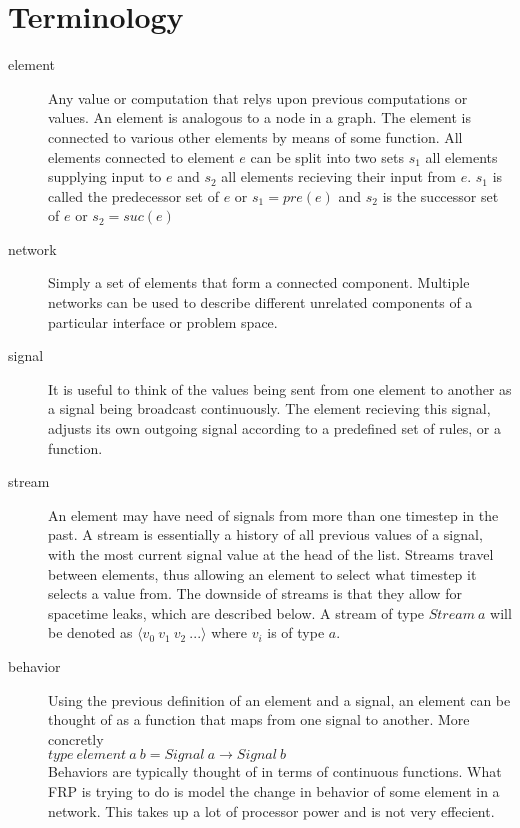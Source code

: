 \documentclass[twocolumn]{paper}
\begin{document}
\section{Terminology}
\begin{description}
\item[element] Any value or computation that relys upon previous computations or values. An element is analogous to a node in a graph. The element is connected to various other elements by means of some function. All elements connected to element $e$ can be split into two sets $s_1$ all elements supplying input to $e$ and $s_2$ all elements recieving their input from $e$. $s_1$ is called the predecessor set of $e$ or $s_1 = pre(e)$ and $s_2$ is the successor set of $e$ or $s_2 = suc(e)$

\item[network] Simply a set of elements that form a connected component. Multiple networks can be used to describe different unrelated components of a particular interface or problem space.

\item[signal] It is useful to think of the values being sent from one element to another as a signal being broadcast continuously. The element recieving this signal, adjusts its own outgoing signal according to a predefined set of rules, or a function.

\item[stream] An element may have need of signals from more than one timestep in the past. A stream is essentially a history of all previous values of a signal, with the most current signal value at the head of the list. Streams travel between elements, thus allowing an element to select what timestep it selects a value from. The downside of streams is that they allow for spacetime leaks, which are described below. A stream of type $Stream~a$ will be denoted as $\langle v_0~v_1~v_2~...\rangle$ where $v_i$ is of type $
a$.

\item[behavior] Using the previous definition of an element and a signal, an element can be thought of as a function that maps from one signal to another. More concretly\\
  $type~element~a~b = Signal ~a \rightarrow Signal ~b$\\
  Behaviors are typically thought of in terms of continuous functions. What FRP is trying to do is model the change in behavior of some element in a network. This takes up a lot of processor power  and is not very effecient.


\end{description}
\end{document}
